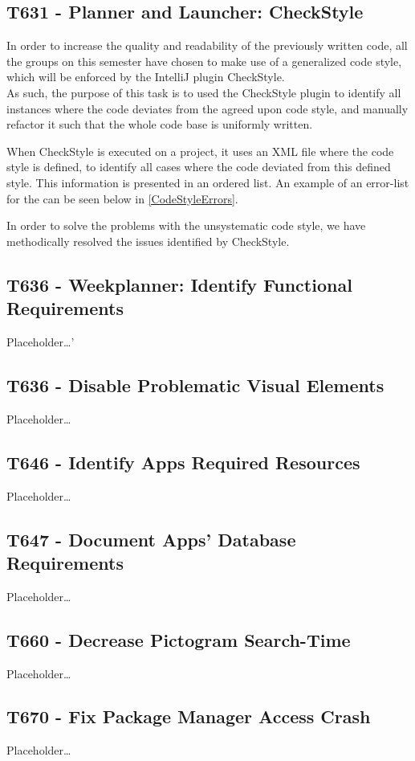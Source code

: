 \subsection{T631 - Planner and Launcher: CheckStyle}
In order to increase the quality and readability of the previously written code,
all the groups on this semester have chosen to make use of a generalized code
style, which will be enforced by the IntelliJ plugin CheckStyle.\\
As such, the purpose of this task is to used the CheckStyle plugin to identify
all instances where the code deviates from the agreed upon code style, and
manually refactor it such that the whole code base is uniformly written.\nl

When CheckStyle is executed on a project, it uses an XML file where the code
style is defined, to identify all cases where the code deviated from this
defined style. This information is presented in an ordered list. An example of
an error-list for the  can be seen below in
\autoref{CodeStyleErrors}.


In order to solve the problems with the unsystematic code style, we have
methodically resolved the issues identified by CheckStyle.

\subsection{T636 - Weekplanner: Identify Functional Requirements}
Placeholder\ldots'


\subsection{T636 - Disable Problematic Visual Elements}
Placeholder\ldots

\subsection{T646 - Identify Apps Required Resources}
Placeholder\ldots

\subsection{T647 - Document Apps' Database Requirements}
Placeholder\ldots

\subsection{T660 - Decrease Pictogram Search-Time}
Placeholder\ldots

\subsection{T670 - Fix Package Manager Access Crash}
Placeholder\ldots


